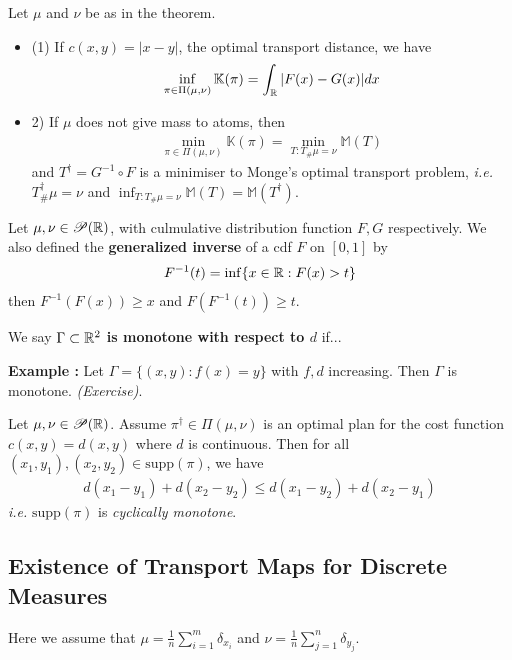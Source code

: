 \documentclass[10pt,a4paper]{article}
\renewenvironment{i}
{\begin{itemize} 
	}%
	{\end{itemize}
}
\begin{document}
 Let $\mu$ and $\nu$ be as in the theorem.
\begin{i}
\item[(1)] If $c(x,y) = |x-y|$, the optimal transport distance, we have
\begin{align*}
\inf_{\pi \in \Pi(\mu, \nu)} \mathbb{K}(\pi) = \int_{\mathbb{R}} |F(x) - G(x)| dx
\end{align*}
\item[2)] If $\mu$ does not give mass to atoms, then 
\begin{align*}
\min_{\pi \in \Pi(\mu, \nu)} \mathbb{K}(\pi) = \min_{T: T_{\#}\mu =\nu} \mathbb{M}(T)
\end{align*}
and $T^{\dagger} = G^{-1}\circ F$ is a minimiser to Monge's optimal transport problem, \textit{i.e.} $T_{\#}^{\dagger} \mu = \nu$ and $\inf_{T: T_{\#} \mu = \nu} \mathbb{M}(T) = \mathbb{M}(T^{\dagger})$.
\end{i}
\s

Let $\mu, \nu \in \mathscr{P}(\mathbb{R})$, with culmulative distribution function $F,G$ respectively. We also defined the \textbf{generalized inverse} of a cdf $F$ on $[0,1]$ by
\begin{align*}
F^{-1}(t) = \inf \{x\in \mathbb{R} : F(x) > t\}
\end{align*}
then $F^{-1}(F(x))\geq x$ and $F(F^{-1}(t)) \geq t$.
\s

 We say \textbf{$\Gamma \subset \mathbb{R}^2$ is monotone with respect to $d$} if...
\s

\textbf{Example :} Let $\Gamma = \{(x,y) : f(x)=y\}$ with $f,d$ increasing. Then $\Gamma$ is monotone. \emph{(Exercise)}.
\s

 Let $\mu, \nu \in\mathscr{P}(\mathbb{R})$. Assume $\pi^{\dagger} \in \Pi(\mu, \nu)$ is an optimal plan for the cost function $c(x,y) = d(x,y)$ where $d$ is continuous. Then for all $(x_1, y_1), (x_2, y_2) \in \text{supp}(\pi)$, we have
\begin{align*}
d(x_1 -y_1) + d(x_2-y_2) \leq d(x_1-y_2)+d(x_2-y_1)
\end{align*}
\textit{i.e.} $\text{supp}(\pi)$ is \emph{cyclically monotone}.

\subsection{Existence of Transport Maps for Discrete Measures}

Here we assume that $\mu = \frac{1}{n} \sum_{i=1}^m \delta_{x_i}$ and $\nu = \frac{1}{n} \sum_{j=1}^n \delta_{y_j}$.
\s
\end{document}

